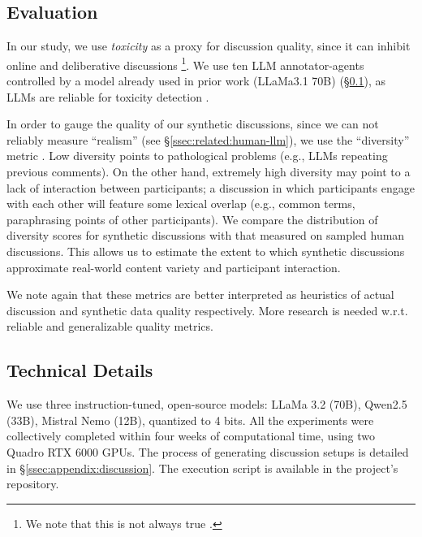 \subsection{Evaluation}
\label{ssec:experimental:evaluation}

In our study, we use \emph{toxicity} as a proxy for discussion quality, since it can inhibit online and deliberative discussions \citep{dekock2022disagree, XiaToxicity}\footnote{We note that this is not always true \citep{Avalle2024PersistentIP}.}. We use ten \ac{LLM} annotator-agents controlled by a model already used in prior work (LLaMa3.1 70B) \cite{kang-qian-2024-implanting} (\S\ref{ssec:experimental:evaluation}), as \acp{LLM} are reliable for toxicity detection \citep{kang-qian-2024-implanting, Wang2022ToxicityDW, anjum2024hate}.

In order to gauge the quality of our synthetic discussions, since we can not reliably measure ``realism'' (see \S\ref{ssec:related:human-llm}), we use the ``diversity'' metric \citep{ulmer2024}. Low diversity points to pathological problems (e.g., \acp{LLM} repeating previous comments). On the other hand, extremely high diversity may point to a lack of interaction between participants; a discussion in which participants engage with each other will feature some lexical overlap (e.g., common terms, paraphrasing points of other participants). We compare the distribution of diversity scores for synthetic discussions with that measured on sampled human discussions. This allows us to estimate the extent to which synthetic discussions approximate real-world content variety and participant interaction. 

We note again that these metrics are better interpreted as heuristics of actual discussion and synthetic data quality respectively. More research is needed w.r.t. reliable and generalizable quality metrics.


\subsection{Technical Details}
\label{ssec:experimental:setup}

We use three instruction-tuned, open-source models: LLaMa 3.2 (70B), Qwen2.5 (33B),  Mistral Nemo (12B), quantized to 4 bits. All the experiments were collectively completed within four weeks of computational time, using two Quadro RTX 6000 GPUs. The process of generating discussion setups is detailed in \S\ref{ssec:appendix:discussion}. The execution script is available in the project's repository.\analysislink 